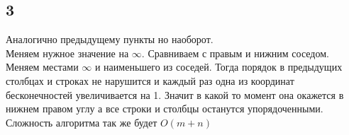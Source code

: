 \documentclass[12pt]{exam}
\begin{document}
\subsection*{3}
Аналогично предыдущему пункты но наоборот. \\
Меняем нужное значение на $\infty$. Сравниваем с правым и нижним соседом. 
Меняем местами $\infty$ и наименьшего из соседей. 
Тогда порядок в предыдущих столбцах и строках не нарушится и 
каждый раз одна из координат бесконечностей увеличивается на 1. 
Значит в какой то момент она окажется в нижнем правом углу а все строки и столбцы останутся упорядоченными.
Сложность алгоритма так же будет $O(m + n)$
\end{document}
